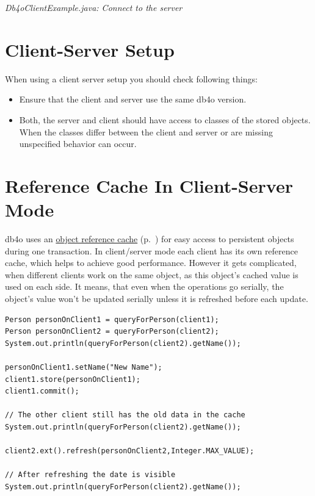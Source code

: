 {\small\itshape Db4oClientExample.java: Connect to the server\par}
\medskip

\section*{Client-Server Setup}

When using a client server setup you should check following things:

\begin{itemize}
\item Ensure that the client and server use the same db4o version.
\item Both, the server and client should have access to classes of the stored objects. When the classes differ between the client and server or are missing unspecified behavior can occur.
\end{itemize}

\section{Reference Cache In Client-Server Mode}
\label{ref:client-server-reference-cache-in-client-server-mode}

db4o uses an \hyperref[ref:basics-indentity-concept-reference-cache]{object reference cache} (p.~\pageref{ref:basics-indentity-concept-reference-cache}) for easy access to persistent objects during one transaction. In client/server mode each client has its own reference cache, which helps to achieve good performance. However it gets complicated, when different clients work on the same object, as this object's cached value is used on each side. It means, that even when the operations go serially, the object's value won't be updated serially unless it is refreshed before each update.

\begin{lstlisting}
Person personOnClient1 = queryForPerson(client1);
Person personOnClient2 = queryForPerson(client2);
System.out.println(queryForPerson(client2).getName());

personOnClient1.setName("New Name");
client1.store(personOnClient1);
client1.commit();

// The other client still has the old data in the cache
System.out.println(queryForPerson(client2).getName());

client2.ext().refresh(personOnClient2,Integer.MAX_VALUE);

// After refreshing the date is visible
System.out.println(queryForPerson(client2).getName());
\end{lstlisting}

